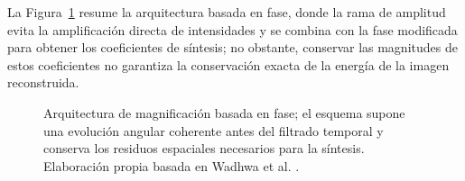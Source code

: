 La Figura~\ref{fig:fase_pipeline} resume la arquitectura basada en fase, donde la rama de amplitud evita la amplificación directa de intensidades y se combina con la fase modificada para obtener los coeficientes de síntesis; no obstante, conservar las magnitudes de estos coeficientes no garantiza la conservación exacta de la energía de la imagen reconstruida.

\begin{figure}[htbp]
\centering
{}
\caption[Arquitectura de magnificación basada en fase]{Arquitectura de magnificación basada en fase; el esquema supone una evolución angular coherente antes del filtrado temporal y conserva los residuos espaciales necesarios para la síntesis. Elaboración propia basada en Wadhwa et al. \cite{wadhwa2013phase}.}
\label{fig:fase_pipeline}
\end{figure}


